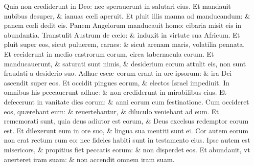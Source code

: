 \documentclass[a5paper,10pt]{book}
\def\ae{æ}
\def\oe{œ}
\begin{document}
\begin{multicols*}{2}
\newline \color{red} Q\color{black}uia non crediderunt in Deo: nec sperauerunt in salutari eius.
\newline \color{red} E\color{black}t mandauit nubibus desuper, \& ianuas c\oe li aperuit.
\newline \color{red} E\color{black}t pluit illis manna ad manducandum: \& panem c\oe li dedit eis.
\newline \color{red} P\color{black}anem Angelorum manducauit homo: cibaria misit eis in abundantia.
\newline \color{red} T\color{black}ranstulit Austrum de c\oe lo: \& induxit in virtute sua Africum.
\newline \color{red} E\color{black}t pluit super eos, sicut puluerem, carnes: \& sicut arenam maris, volatilia pennata.
\newline \color{red} E\color{black}t ceciderunt in medio castrorum eorum, circa tabernacula eorum.
\newline \color{red} E\color{black}t manducauerunt, \& saturati sunt nimis, \& desiderium eorum attulit eis, non sunt fraudati a desiderio suo.
\newline \color{red} A\color{black}dhuc esc\ae \ eorum erant in ore ipsorum: \& ira Dei ascendit super eos.
\newline \color{red} E\color{black}t occidit pingues eorum, \& electos Israel impediuit.
\newline \color{red} I\color{black}n omnibus his peccauerunt adhuc: \& non crediderunt in mirabilibus eius.
\newline \color{red} E\color{black}t defecerunt in vanitate dies eorum: \& anni eorum cum festinatione.
\newline \color{red} C\color{black}um occideret eos, qu\ae rebant eum: \& reuertebantur, \& diluculo veniebant ad eum.
\newline \color{red} E\color{black}t rememorati sunt, quia deus adiutor est eorum, \& Deus excelsus redemptor eorum est.
\newline \color{red} E\color{black}t dilexerunt eum in ore suo, \& lingua sua mentiti sunt ei.
\newline \color{red} C\color{black}or autem eorum non erat rectum cum eo: nec fideles habiti sunt in testamento eius.
\newline \color{red} I\color{black}pse autem est misericors, \& propitius fiet peccatis eorum: \& non disperdet eos.
\newline \color{red} E\color{black}t abundauit, vt auerteret iram suam: \& non accendit omnem iram suam.

\end{multicols*}
\end{document}
